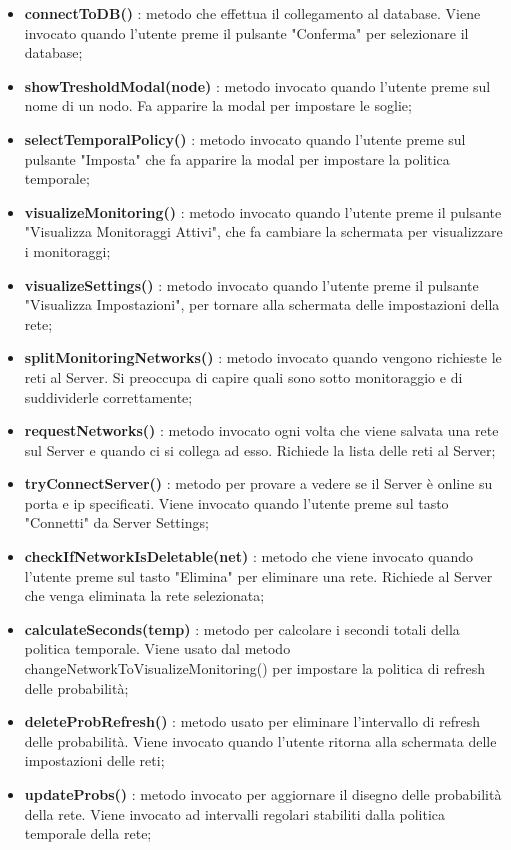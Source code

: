 \begin{itemize}
			\item \textbf{connectToDB()} : metodo che effettua il collegamento al database. Viene invocato quando l'utente preme il pulsante "Conferma" per selezionare il database;
			\item \textbf{showTresholdModal(node)} : metodo invocato quando l'utente preme sul nome di un nodo. Fa apparire la modal per impostare le soglie;
			\item \textbf{selectTemporalPolicy()} : metodo invocato quando l'utente preme sul pulsante "Imposta" che fa apparire la modal per impostare la politica temporale;
			\item \textbf{visualizeMonitoring()} : metodo invocato quando l'utente preme il pulsante "Visualizza Monitoraggi Attivi", che fa cambiare la schermata per visualizzare i monitoraggi;
			\item \textbf{visualizeSettings()} : metodo invocato quando l'utente preme il pulsante "Visualizza Impostazioni", per tornare alla schermata delle impostazioni della rete;
			\item \textbf{splitMonitoringNetworks()} : metodo invocato quando vengono richieste le reti al Server. Si preoccupa di capire quali sono sotto monitoraggio e di suddividerle correttamente;
			\item \textbf{requestNetworks()} : metodo invocato ogni volta che viene salvata una rete sul Server e quando ci si collega ad esso. Richiede la lista delle reti al Server;
			\item \textbf{tryConnectServer()} : metodo per provare a vedere se il Server è online su porta e ip specificati. Viene invocato quando l'utente preme sul tasto "Connetti" da Server Settings;
			\item \textbf{checkIfNetworkIsDeletable(net)} : metodo che viene invocato quando l'utente preme sul tasto "Elimina" per eliminare una rete. Richiede al Server che venga eliminata la rete selezionata;
			\item \textbf{calculateSeconds(temp)} : metodo per calcolare i secondi totali della politica temporale. Viene usato dal metodo changeNetworkToVisualizeMonitoring() per impostare la politica di refresh delle probabilità;
			\item \textbf{deleteProbRefresh()} : metodo usato per eliminare l'intervallo di refresh delle probabilità. Viene invocato quando l'utente ritorna alla schermata delle impostazioni delle reti;
			\item \textbf{updateProbs()} : metodo invocato per aggiornare il disegno delle probabilità della rete. Viene invocato ad intervalli regolari stabiliti dalla politica temporale della rete;

\end{itemize}
